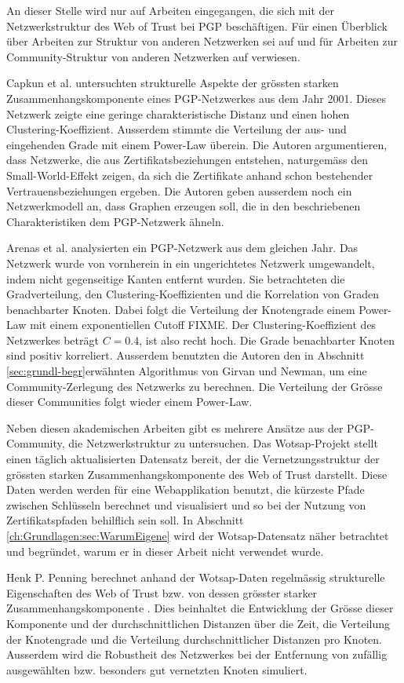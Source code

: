 An dieser Stelle wird nur auf Arbeiten eingegangen, die sich mit der
Netzwerkstruktur des Web of Trust bei PGP besch\"aftigen. F\"ur einen
\"Uberblick \"uber Arbeiten zur Struktur von anderen Netzwerken sei
auf \cite{newman:167}und f\"ur Arbeiten zur Community-Struktur von
anderen Netzwerken auf \cite{Fortunato2010} verwiesen.

Capkun et al. \cite{Capkun2002} untersuchten strukturelle Aspekte der
gr\"ossten starken Zusammenhangskomponente eines PGP-Netzwerkes aus
dem Jahr 2001. Dieses Netzwerk zeigte eine geringe charakteristische
Distanz und einen hohen Clustering-Koeffizient. Ausserdem stimmte die
Verteilung der aus- und eingehenden Grade mit einem Power-Law
\"uberein. Die Autoren argumentieren, dass Netzwerke, die aus
Zertifikatsbeziehungen entstehen, naturgem\"ass den Small-World-Effekt
zeigen, da sich die Zertifikate anhand schon bestehender
Vertrauensbeziehungen ergeben. Die Autoren geben ausserdem noch ein
Netzwerkmodell an, dass Graphen erzeugen soll, die in den
beschriebenen Charakteristiken dem PGP-Netzwerk \"ahneln.

Arenas et al. \cite{Boguna2004} analysierten ein PGP-Netzwerk aus dem
gleichen Jahr. Das Netzwerk wurde von vornherein in ein ungerichtetes
Netzwerk umgewandelt, indem nicht gegenseitige Kanten entfernt
wurden. Sie betrachteten die Gradverteilung, den
Clustering-Koeffizienten und die Korrelation von Graden benachbarter
Knoten. Dabei folgt die Verteilung der Knotengrade einem Power-Law mit
einem exponentiellen Cutoff FIXME. Der Clustering-Koeffizient des
Netzwerkes betr\"agt $C=0.4$, ist also recht hoch. Die Grade
benachbarter Knoten sind positiv korreliert. Ausserdem benutzten die
Autoren den in Abschnitt \ref{sec:grundl-begr}erw\"ahnten Algorithmus
von Girvan und Newman, um eine Community-Zerlegung des Netzwerks zu
berechnen. Die Verteilung der Gr\"osse dieser Communities folgt wieder
einem Power-Law.

Neben diesen akademischen Arbeiten gibt es mehrere Ans\"atze aus der
PGP-Community, die Netzwerkstruktur zu untersuchen. Das
Wotsap-Projekt\cite{Cederlof} stellt einen t\"aglich aktualisierten
Datensatz bereit, der die Vernetzungsstruktur der gr\"ossten starken
Zusammenhangskomponente des Web of Trust darstellt. Diese Daten werden
werden f\"ur eine Webapplikation benutzt, die k\"urzeste Pfade
zwischen Schl\"usseln berechnet und visualisiert und so bei der
Nutzung von Zertifikatspfaden behilflich sein soll. In Abschnitt
\ref{ch:Grundlagen:sec:WarumEigene} wird der Wotsap-Datensatz n\"aher
betrachtet und begr\"undet, warum er in dieser Arbeit nicht verwendet
wurde. 

Henk P. Penning berechnet anhand der Wotsap-Daten regelm\"assig
strukturelle Eigenschaften des Web of Trust bzw. von dessen gr\"osster
starker Zusammenhangskomponente \cite{Penning}. Dies beinhaltet die
Entwicklung der Gr\"osse dieser Komponente und der durchschnittlichen
Distanzen \"uber die Zeit, die Verteilung der Knotengrade und die
Verteilung durchschnittlicher Distanzen pro Knoten. Ausserdem wird die
Robustheit des Netzwerkes bei der Entfernung von zuf\"allig
ausgew\"ahlten bzw. besonders gut vernetzten Knoten simuliert.

